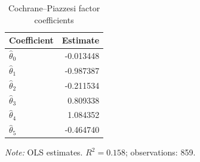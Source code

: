 \begin{table}[htbp]
\centering
\caption{Cochrane--Piazzesi factor coefficients}
\label{tab:q4d}
\begin{tabular}{lr}
\toprule
Coefficient & Estimate \\
\midrule
$\hat{\theta}_0$ & -0.013448 \\
$\hat{\theta}_1$ & -0.987387 \\
$\hat{\theta}_2$ & -0.211534 \\
$\hat{\theta}_3$ & 0.809338 \\
$\hat{\theta}_4$ & 1.084352 \\
$\hat{\theta}_5$ & -0.464740 \\
\bottomrule
\end{tabular}
\begin{minipage}{0.72\textwidth}
\footnotesize\textit{Note:} OLS estimates. $R^2=0.158$; observations: 859.
\end{minipage}
\end{table}
